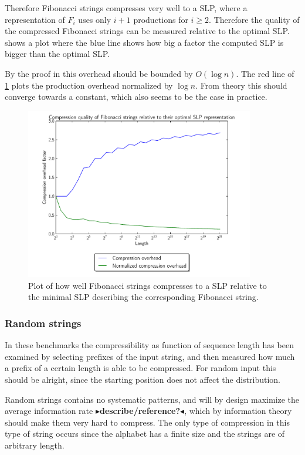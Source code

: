\documentclass[twoside,11pt,openright]{report}
\newcommand{\todo}[1]{{\color[rgb]{.5,0,0}\textbf{$\blacktriangleright$#1$\blacktriangleleft$}}}
\begin{document}
Therefore Fibonacci strings compresses very well to a SLP, where a representation of $F_{i}$ uses only $i + 1$ productions for $i \geq 2$. Therefore the quality of the compressed Fibonacci strings can be measured relative to the optimal SLP.  shows a plot where the blue line shows how big a factor the computed SLP is bigger than the optimal SLP.

By the proof in \cite{Rytter2003211} this overhead should be bounded by $O(\log{n})$. The red line of \cref{fig:compression:quality:fibonacci} plots the production overhead normalized by $\log{n}$. From theory this should converge towards a constant, which also seems to be the case in practice.
%
\begin{figure}[h!]
  \centering
  \includegraphics[width=10cm]{compression/fib}
  \caption{Plot of how well Fibonacci strings compresses to a SLP relative to the minimal SLP describing the corresponding Fibonacci string.}
  \label{fig:compression:quality:fibonacci}
\end{figure}

\subsubsection{Random strings}
In these benchmarks the compressibility as function of sequence length has been examined by selecting prefixes of the input string, and then measured how much a prefix of a certain length is able to be compressed. For random input this should be alright, since the starting position does not affect the distribution.

Random strings contains no systematic patterns, and will by design maximize the average information rate \todo{describe/reference?}, which by information theory should make them very hard to compress. The only type of compression in this type of string occurs since the alphabet has a finite size and the strings are of arbitrary length.
\end{document}
